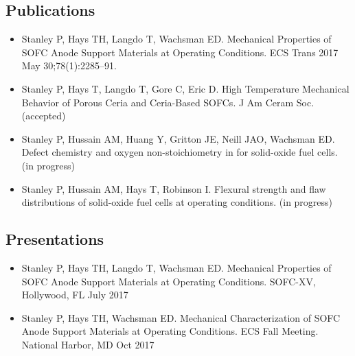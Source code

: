     \subsection*{Publications}
        \begin{itemize}
            \item Stanley P, Hays TH, Langdo T, Wachsman ED. Mechanical Properties of SOFC Anode Support Materials at Operating Conditions. ECS Trans 2017 May 30;78(1):2285–91.
            \item Stanley P, Hays T, Langdo T, Gore C, Eric D. High Temperature Mechanical Behavior of Porous Ceria and Ceria-Based SOFCs. J Am Ceram Soc.  (accepted)
            \item Stanley P, Hussain AM, Huang Y, Gritton JE, Neill JAO, Wachsman ED. Defect chemistry and oxygen non-stoichiometry in  for solid-oxide fuel cells. (in progress)
            \item Stanley P, Hussain AM, Hays T, Robinson I. Flexural strength and flaw distributions of  solid-oxide fuel cells at operating conditions. (in progress)
        \end{itemize}

    \subsection*{Presentations}
    \begin{itemize}
        \item Stanley P, Hays TH, Langdo T, Wachsman ED. Mechanical Properties of SOFC Anode Support Materials at Operating Conditions. SOFC-XV, Hollywood, FL  July 2017
        \item Stanley P, Hays TH,  Wachsman ED. Mechanical Characterization of SOFC Anode Support Materials at Operating Conditions. ECS Fall Meeting. National Harbor, MD Oct 2017
    \end{itemize}
